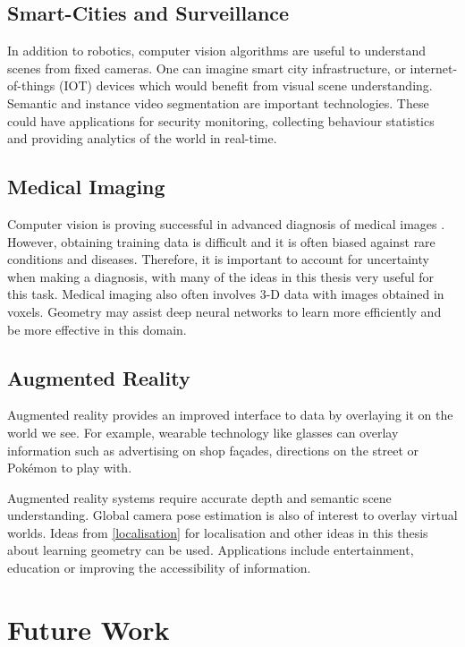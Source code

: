 \subsection{Smart-Cities and Surveillance}
In addition to robotics, computer vision algorithms are useful to understand scenes from fixed cameras. One can imagine smart city infrastructure, or internet-of-things (IOT) devices which would benefit from visual scene understanding. Semantic and instance video segmentation are important technologies. These could have applications for security monitoring, collecting behaviour statistics and providing analytics of the world in real-time.

\subsection{Medical Imaging}
Computer vision is proving successful in advanced diagnosis of medical images \citep{ronneberger2015u}. However, obtaining training data is difficult and it is often biased against rare conditions and diseases. Therefore, it is important to account for uncertainty when making a diagnosis, with many of the ideas in this thesis very useful for this task. Medical imaging also often involves 3-D data with images obtained in voxels. Geometry may assist deep neural networks to learn more efficiently and be more effective in this domain.

\subsection{Augmented Reality}
Augmented reality provides an improved interface to data by overlaying it on the world we see. For example, wearable technology like glasses can overlay information such as advertising on shop façades, directions on the street or Pokémon to play with.

Augmented reality systems require accurate depth and semantic scene understanding. Global camera pose estimation is also of interest to overlay virtual worlds. Ideas from \cref{localisation} for localisation and other ideas in this thesis about learning geometry can be used. Applications include entertainment, education or improving the accessibility of information.



\section{Future Work}

